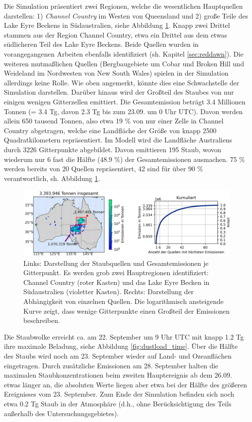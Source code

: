 \documentclass[12pt,a4paper,onecolumn,headheight=30pt]{scrartcl}
\begin{document}
Die Simulation präsentiert zwei Regionen, welche die wesentlichen Hauptquellen darstellen: 1) \textit{Channel Country} im Westen von Queensland und 2) große Teile des Lake Eyre Beckens in Südaustralien, siehe Abbildung \ref{fig:emissions}. Knapp zwei Drittel stammen aus der Region Channel Country, etwa ein Drittel aus dem etwas südlicheren Teil des Lake Eyre Beckens. Beide Quellen wurden in vorangegangenen Arbeiten ebenfalls identifiziert (sh. Kapitel \ref{sec:reddawn}). Die weiteren mutmaßlichen Quellen (Bergbaugebiete um Cobar und Broken Hill und Weideland im Nordwesten von New South Wales) spielen in der Simulation allerdings  keine Rolle. Wie oben angemerkt, könnte dies eine Schwachstelle der Simulation darstellen. Darüber hinaus wird der Großteil des Staubes von nur einigen wenigen Gitterzellen emittiert. Die Gesamtemission beträgt 3.4 Millionen Tonnen (= 3.4 Tg, davon 2.3 Tg bis zum 23.09. um 0 Uhr UTC). Davon werden allein 650 tausend Tonnen, also etwa 19 \% von nur einer Zelle in Channel Country abgetragen, welche eine Landfläche der Größe von knapp 2500 Quadratkilometern repräsentiert. Im Modell wird die Landfläche Australiens durch 3226 Gitterpunkte abgebildet. Davon emittieren 195 Staub, wovon wiederum nur 6 fast die Hälfte (48.9 \%) der Gesamtemissionen ausmachen. 75 \% werden bereits von 20 Quellen repräsentiert, 42 sind für über 90 \% verantwortlich, sh. Abbildung \ref{fig:emissions}. 
\begin{figure}[htbp]
\includegraphics[width=\textwidth]{bilder/emission_sections.png}
\caption{Links: Darstellung der Staubquellen und Gesamtemissionen je Gitterpunkt. Es werden grob zwei Hauptregionen identifiziert: Channel Country (roter Kasten) und das Lake Eyre Becken in Südaustralien (violetter Kasten). Rechts: Darstellung der Abhängigkeit von einzelnen Quellen. Die logarithmisch ansteigende Kurve zeigt, dass wenige Gitterpunkte einen Großteil der Emissionen beschreiben.} \label{fig:emissions}
\end{figure}
Die Staubwolke erreicht ca. am 22. September um 9 Uhr UTC mit knapp 1.2 Tg ihre maximale Beladung, siehe Abbildung \ref{fig:dustload_time}. Über die Hälfte des Staubs wird noch am 23. September wieder auf Land- und Ozeanflächen eingetragen. Durch zusätzliche Emissionen am 28. September halten die maximalen Staubkonzentrationen beim zweiten Hauptereignis ab dem 26.09. etwas länger an, die absoluten Werte liegen aber etwa bei der Hälfte des größeren Ereignisses vom 23. September. Zum Ende der Simulation befinden sich noch etwa 0.2 Tg Staub in der Atmosphäre (d.h., ohne Berücksichtigung des Teils außerhalb des Untersuchungsgebietes).
\end{document}
